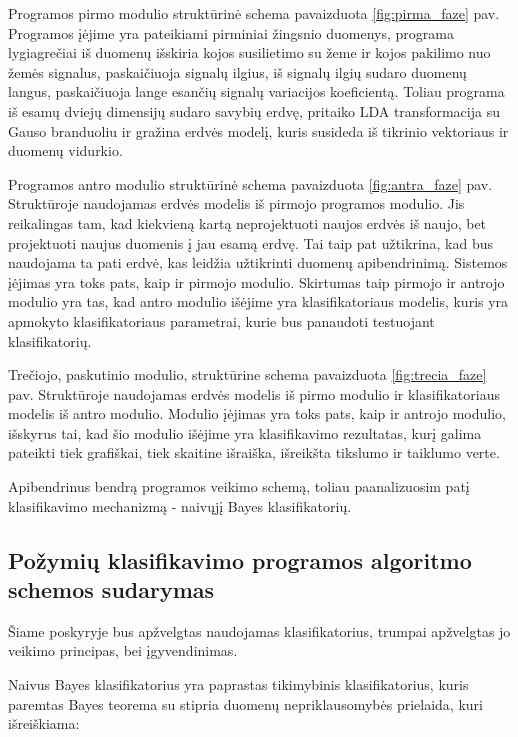 \documentclass[]{vgtuef}
\begin{document}
Programos pirmo modulio struktūrinė schema pavaizduota \ref{fig:pirma_faze} pav. Programos įėjime yra pateikiami pirminiai žingsnio duomenys, programa lygiagrečiai iš duomenų išskiria kojos susilietimo su žeme ir kojos pakilimo nuo žemės signalus, paskaičiuoja signalų ilgius, iš signalų ilgių sudaro duomenų langus, paskaičiuoja lange esančių signalų variacijos koeficientą. Toliau programa iš esamų dviejų dimensijų sudaro savybių erdvę, pritaiko LDA transformacija su Gauso branduoliu ir gražina erdvės modelį, kuris susideda iš tikrinio vektoriaus ir duomenų vidurkio.

Programos antro modulio struktūrinė schema pavaizduota \ref{fig:antra_faze} pav. Struktūroje naudojamas erdvės modelis iš pirmojo programos modulio. Jis reikalingas tam, kad kiekvieną kartą neprojektuoti naujos erdvės iš naujo, bet projektuoti naujus duomenis į jau esamą erdvę. Tai taip pat užtikrina, kad bus naudojama ta pati erdvė, kas leidžia užtikrinti duomenų apibendrinimą. Sistemos įėjimas yra toks pats, kaip ir pirmojo modulio. Skirtumas taip pirmojo ir antrojo modulio yra tas, kad antro modulio išėjime yra klasifikatoriaus modelis, kuris yra apmokyto klasifikatoriaus parametrai, kurie bus panaudoti testuojant klasifikatorių.

Trečiojo, paskutinio modulio, struktūrine schema pavaizduota \ref{fig:trecia_faze} pav. Struktūroje naudojamas erdvės modelis iš pirmo modulio ir klasifikatoriaus modelis iš antro modulio. Modulio įėjimas yra toks pats, kaip ir antrojo modulio, išskyrus tai, kad šio modulio išėjime yra klasifikavimo rezultatas, kurį galima pateikti tiek grafiškai, tiek skaitine išraiška, išreikšta tikslumo ir taiklumo verte.

Apibendrinus bendrą programos veikimo schemą, toliau paanalizuosim patį klasifikavimo mechanizmą - naivųjį Bayes klasifikatorių.

\subsection{Požymių klasifikavimo programos algoritmo schemos sudarymas}
\label{subsec:class_scheme}

Šiame poskyryje bus apžvelgtas naudojamas klasifikatorius, trumpai apžvelgtas jo veikimo principas, bei įgyvendinimas.

Naivus Bayes klasifikatorius \cite{R22230} yra paprastas tikimybinis klasifikatorius, kuris paremtas Bayes teorema su stipria duomenų nepriklausomybės prielaida, kuri išreiškiama:
\end{document}
